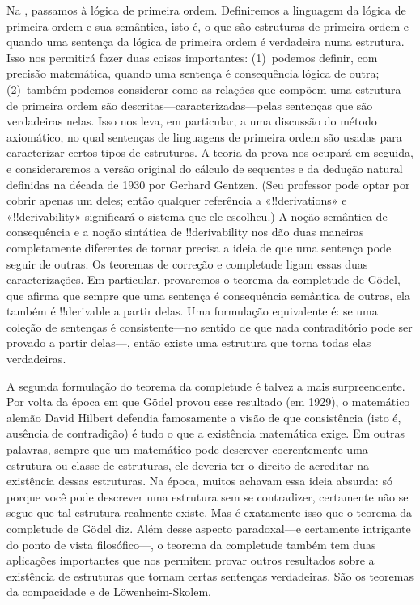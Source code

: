 Na , passamos à lógica de primeira ordem.
Definiremos a linguagem da lógica de primeira ordem e sua semântica,
isto é, o que são estruturas de primeira ordem e quando uma sentença
da lógica de primeira ordem é verdadeira numa estrutura. Isso nos
permitirá fazer duas coisas importantes: (1)~podemos definir, com
precisão matemática, quando uma sentença é consequência lógica de
outra; (2)~também podemos considerar como as relações que compõem uma
estrutura de primeira ordem são descritas---caracterizadas---pelas
sentenças que são verdadeiras nelas. Isso nos leva, em particular, a
uma discussão do método axiomático, no qual sentenças de linguagens de
primeira ordem são usadas para caracterizar certos tipos de estruturas.
A teoria da prova nos ocupará em seguida, e consideraremos a versão
original do cálculo de sequentes e da dedução natural definidas na
década de 1930 por Gerhard Gentzen. (Seu professor pode optar por
cobrir apenas um deles; então qualquer referência a
«!!{derivation}s» e «!!{derivability}» significará o sistema que ele
escolheu.) A noção semântica de consequência e a noção sintática de
!!{derivability} nos dão duas maneiras completamente diferentes de
tornar precisa a ideia de que uma sentença pode seguir de outras. Os
teoremas de correção e completude ligam essas duas caracterizações.
Em particular, provaremos o teorema da completude de Gödel, que
afirma que sempre que uma sentença é consequência semântica de outras,
ela também é !!{derivable} a partir delas. Uma formulação equivalente
é: se uma coleção de sentenças é consistente---no sentido de que nada
contraditório pode ser provado a partir delas---, então existe uma
estrutura que torna todas elas verdadeiras.

A segunda formulação do teorema da completude é talvez a mais
surpreendente. Por volta da época em que Gödel provou esse resultado
(em 1929), o matemático alemão David Hilbert defendia famosamente a
visão de que consistência (isto é, ausência de contradição) é tudo o
que a existência matemática exige. Em outras palavras, sempre que um
matemático pode descrever coerentemente uma estrutura ou classe de
estruturas, ele deveria ter o direito de acreditar na existência
dessas estruturas. Na época, muitos achavam essa ideia absurda: só
porque você pode descrever uma estrutura sem se contradizer, certamente
não se segue que tal estrutura realmente existe. Mas é exatamente isso
que o teorema da completude de Gödel diz. Além desse aspecto
paradoxal---e certamente intrigante do ponto de vista filosófico---, o
teorema da completude também tem duas aplicações importantes que nos
permitem provar outros resultados sobre a existência de estruturas que
tornam certas sentenças verdadeiras. São os teoremas da compacidade e
de Löwenheim-Skolem.

